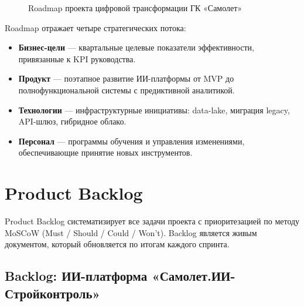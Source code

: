 \documentclass[12pt,a4paper]{article}
\begin{document}
\begin{figure}[H]
\caption{Roadmap проекта цифровой трансформации ГК «Самолет»}
\label{fig:roadmap}
\end{figure}

Roadmap отражает четыре стратегических потока:

\begin{itemize}[leftmargin=20pt]
  \item \textbf{Бизнес-цели} --- квартальные целевые показатели эффективности, привязанные к KPI руководства.
  \item \textbf{Продукт} --- поэтапное развитие ИИ-платформы от MVP до полнофункциональной системы с предиктивной аналитикой.
  \item \textbf{Технологии} --- инфраструктурные инициативы: data-lake, миграция legacy, API-шлюз, гибридное облако.
  \item \textbf{Персонал} --- программы обучения и управления изменениями, обеспечивающие принятие новых инструментов.
\end{itemize}

\newpage

\section{Product Backlog}

Product Backlog систематизирует все задачи проекта с приоритезацией по методу MoSCoW (Must / Should / Could / Won't). Backlog является живым документом, который обновляется по итогам каждого спринта.

\subsection{Backlog: ИИ-платформа «Самолет.ИИ-Стройконтроль»}
\end{document}
